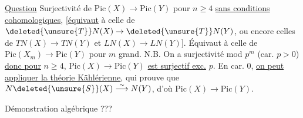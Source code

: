 \uline{Question} Surjectivité  de $\mathrm{Pic}(X)\to\mathrm{Pic}(Y)$  pour $n\geq4$ \uline{sans conditions cohomologiques}, [\uline{équivaut} à celle de $\deleted{\unsure{T}}N(X)\to\deleted{\unsure{T}}N(Y)$, ou encore celles de $TN(X)\to TN(Y)$ et $LN(X)\to LN(Y)$]. Équivaut à celle de $\mathrm{Pic}(X_{m})\to\mathrm{Pic}(Y)$ pour $m$ grand. N.B. On a surjectivité mod $p^{m}$ (car. $p>0$) \uline{donc pour} $n\geq4$, $\mathrm{Pic}(X)\to\mathrm{Pic}(Y)$ \uline{est surjectif exc.} $p$.
\margin{Corollaire : $\rho(X)=\rho(Y)$ pour $n\geq4$ [$\rho(X)\leq\rho(Y)$ si $n\geq3$] \deleted{$\rho(X)\leq\rho(Y)+1$ si $n=2$ et $\unsure{Y}$ \uuline{général}]}}
 En car. $0$, \uline{on peut appliquer la théorie Kählérienne}, qui prouve que  $N\deleted{\unsure{S}}(X)\overset{\sim}{\longrightarrow}N(Y)$, d'où $\mathrm{Pic}(X)\longrightarrow\mathrm{Pic}(Y)$.

Démonstration algébrique ???


